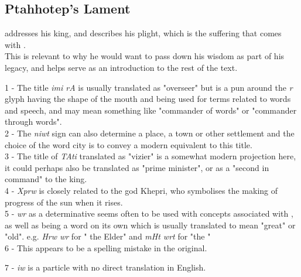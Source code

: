 \subsection*{Ptahhotep's Lament}
\vspace*{\fill}

 addresses his king,  and describes his plight, which is the suffering that comes with .\\

This is relevant to why he would want to pass down his wisdom as part of his legacy, and helps serve as an introduction to the rest of the text.\\

\vspace*{\fill}

1 - The title \textit{imi rA} is usually translated as "overseer" but is a pun around the \textit{r} glyph having the shape of the mouth and being used for terms related to words and speech, and may mean something like "commander of words" or "commander through words".\\

2 - The \textit{niwt} sign can also determine a place, a town or other settlement and the choice of the word city is to convey a modern equivalent to this title.\\

3 - The title of \textit{TAti} translated as "vizier" is a somewhat modern projection here, it could perhaps also be translated as "prime minister", or as a "second in command" to the king.\\

4 - \textit{Xprw} is closely related to the god Khepri, who symbolises the making of progress of the sun when it rises.\\

5 - \textit{wr} as a determinative seems often to be used with concepts associated with \textit{}, as well as being a word on its own which is usually translated to mean "great" or "old". e.g. \textit{Hrw wr} for " the Elder" and \textit{mHt wrt} for "the " \\

6 - This appears to be a spelling mistake in the original.

7 - \textit{iw} is a particle with no direct translation in English.

\vspace*{\fill}

